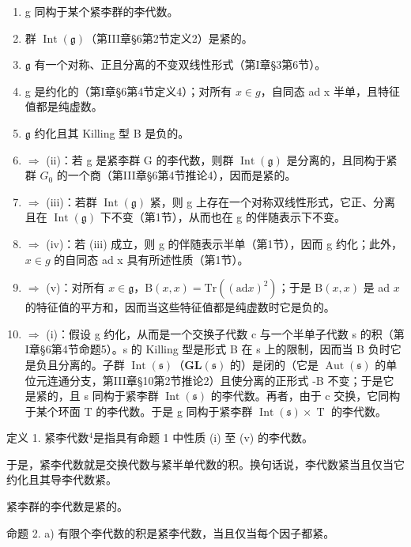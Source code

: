 \begin{enumerate}
\def\labelenumi{(\roman{enumi})}
\item
  g 同构于某个紧李群的李代数。
\item
  群 \(\operatorname{Int}(\mathfrak{g})\)（第III章§6第2节定义2）是紧的。
\item
  \(\mathfrak{g}\) 有一个对称、正且分离的不变双线性形式（第I章§3第6节）。
\item
  g 是约化的（第I章§6第4节定义4）；对所有 \(x \in g\)，自同态 ad x 半单，且特征值都是纯虚数。
\item
  \(\mathfrak{g}\) 约化且其 Killing 型 B 是负的。
\item
  \(\Longrightarrow\) (ii)：若 g 是紧李群 G 的李代数，则群 \(\operatorname{Int}(\mathfrak{g})\) 是分离的，且同构于紧群 \(G_{0}\) 的一个商（第III章§6第4节推论4），因而是紧的。
\item
  \(\Longrightarrow\) (iii)：若群 \(\operatorname{Int}(\mathfrak{g})\) 紧，则 g 上存在一个对称双线性形式，它正、分离且在 \(\operatorname{Int}(\mathfrak{g})\) 下不变（第1节），从而也在 g 的伴随表示下不变。
\item
  \(\Longrightarrow\) (iv)：若 (iii) 成立，则 g 的伴随表示半单（第1节），因而 g 约化；此外，\(x \in g\) 的自同态 ad x 具有所述性质（第1节）。
\item
  \(\Longrightarrow\) (v)：对所有 \(x\in \mathfrak{g}\)，\(\mathrm{B}(x,x) = \mathrm{Tr}((\mathrm{ad}x)^2)\)；于是 \(\mathrm{B}(x,x)\) 是 ad \(x\) 的特征值的平方和，因而当这些特征值都是纯虚数时它是负的。
\item
  \(\Longrightarrow\) (i)：假设 g 约化，从而是一个交换子代数 c 与一个半单子代数 s 的积（第I章§6第4节命题5）。s 的 Killing 型是形式 B 在 s 上的限制，因而当 B 负时它是负且分离的。子群 \(\operatorname{Int}(\mathfrak{s})\)（\(\mathbf{GL}(\mathfrak{s})\) 的）是闭的（它是 \(\operatorname{Aut}(\mathfrak{s})\) 的单位元连通分支，第III章§10第2节推论2）且使分离的正形式 -B 不变；于是它是紧的，且 s 同构于紧李群 \(\operatorname{Int}(\mathfrak{s})\) 的李代数。再者，由于 c 交换，它同构于某个环面 T 的李代数。于是 g 同构于紧李群 \(\operatorname{Int}(\mathfrak{s}) \times \operatorname{T}\) 的李代数。
\end{enumerate}

定义 1. 紧李代数\(^{4}\)是指具有命题 1 中性质 (i) 至 (v) 的李代数。

于是，紧李代数就是交换代数与紧半单代数的积。换句话说，李代数紧当且仅当它约化且其导李代数紧。

紧李群的李代数是紧的。

命题 2. a) 有限个李代数的积是紧李代数，当且仅当每个因子都紧。

